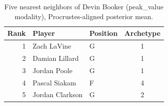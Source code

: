 \begin{table}[htbp]
  \centering\small
  \begin{tabular}{rllc}
    \toprule
    Rank & Player & Position & Archetype \\
    \midrule
    1 & Zach LaVine & G & 1 \\
    2 & Damian Lillard & G & 1 \\
    3 & Jordan Poole & G & 1 \\
    4 & Pascal Siakam & F & 4 \\
    5 & Jordan Clarkson & G & 2 \\
    \bottomrule
  \end{tabular}
  \caption{Five nearest neighbors of Devin Booker (peak_value modality), Procrustes-aligned posterior mean.}
  \label{tab:Devin_Booker_neighbors_peak_value}
\end{table}

